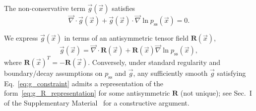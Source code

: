 \documentclass[%
  prl,
  reprint,
  amsmath,
  amssymb,
  aps
]{revtex4-2}
\newcommand{\vvec}[1]{\vec{#1}}
\begin{document}
The non-conservative term $\vvec{g}(\vvec{x})$ satisfies
\begin{equation}
\label{eq:g_constraint}
\vvec{\nabla} \cdot \vvec{g}(\vvec{x}) + \vvec{g}(\vvec{x})\cdot\vvec{\nabla}\ln p_{\mathrm{ss}}(\vvec{x}) = 0.
\end{equation}

We express $\vvec{g}(\vvec{x})$ in terms of an antisymmetric tensor field $\bm{R}(\vvec{x})$,
\begin{equation}
\label{eq:g_R_representation}
 \vvec{g}(\vvec{x}) = \vvec{\nabla} \cdot \bm{R}(\vvec{x}) + \bm{R}(\vvec{x}) \vvec{\nabla} \ln p_{\mathrm{ss}}(\vvec{x}),
 \end{equation}
where $\bm{R}(\vvec{x})^T = -\bm{R}(\vvec{x})$. Conversely, under standard regularity and boundary/decay assumptions on $p_{\mathrm{ss}}$ and $\vvec{g}$, any sufficiently smooth $\vvec{g}$ satisfying Eq.~\eqref{eq:g_constraint} admits a representation of the form~\eqref{eq:g_R_representation} for some antisymmetric $\bm{R}$ (not unique); see Sec.~I of the Supplementary Material~\cite{SM} for a constructive argument.
\end{document}
